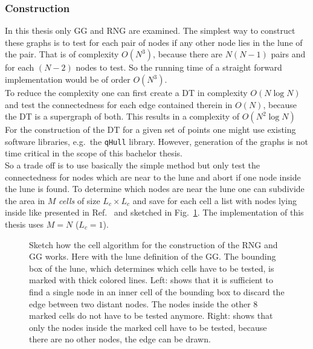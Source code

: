     \subsubsection{Construction}
        In this thesis only GG and RNG are examined.
        The simplest way to construct these graphs is to test for each
        pair of nodes if any other node lies in
        the lune of the pair. That is of complexity \(O (N^3)\), because
        there are \(N(N-1)\) pairs and for each \((N-2)\) nodes to test. So
        the running time of a straight forward implementation would be of
        order \(O(N^3)\).\\
        To reduce the complexity one can first create a DT in complexity \(O (N \log N)\)
        \cite{RNGCell} and test the connectedness for each edge contained
        therein in \(O (N)\), because the DT is a supergraph of both.
        This results in a complexity of \(O (N^2 \log N)\)
        For the construction of the DT for a given set of points one might
        use existing software libraries, e.g.\ the \texttt{qHull}\cite{qhull} library.
        However, generation of the graphs is not time critical in the scope
        of this bachelor thesis.\\
        So a trade off is to use basically the simple method but only test
        the connectedness for nodes which are near to the lune and abort if
        one node inside the lune is found. To determine which nodes are
        near the lune one can subdivide the area in \(M\) \emph{cells} of size
        \(L_c \times L_c\) and save for each cell a list with nodes lying
        inside like presented in Ref.\ \cite{RNGCell} and sketched in Fig.\ \ref{fig:cell}.
        The implementation of this thesis uses \(M = N\) (\(L_c = 1\)).
        \begin{figure}[htbp]
            \centering
            
            
            \caption[Sketch how the Cell Method works]
            {
                Sketch how the cell algorithm for the construction of the
                RNG and GG works. Here with the lune definition of the GG.
                The bounding box of the lune, which determines which cells have
                to be tested, is marked with thick colored lines.
                Left: shows that it is sufficient to find a
                single node in an inner cell of the bounding box to discard
                the edge between two distant nodes. The nodes inside the
                other 8 marked cells do not have to be tested anymore.
                Right: shows that only the nodes inside the
                marked cell have to be tested, because there are no other nodes,
                the edge can be drawn.
            }
            \label{fig:cell}
        \end{figure}\\
